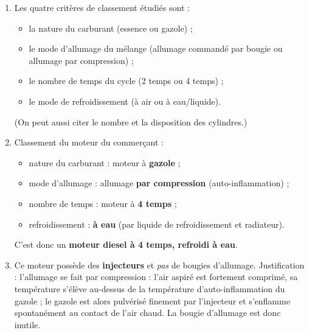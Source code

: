 \documentclass[11pt]{article}
\newcommand{\cle}[1]{{\popxbold\color{popdark}#1}}
\begin{document}
\begin{corrige}
\begin{enumerate}
\item Les quatre critères de classement étudiés sont :
\begin{itemize}
\item la \cle{nature du carburant} (essence ou gazole) ;
\item le \cle{mode d'allumage} du mélange (allumage commandé par bougie ou allumage par compression) ;
\item le \cle{nombre de temps} du cycle (2 temps ou 4 temps) ;
\item le \cle{mode de refroidissement} (à air ou à eau/liquide).
\end{itemize}
(On peut aussi citer le nombre et la disposition des cylindres.)
\item Classement du moteur du commerçant :
\begin{itemize}
\item nature du carburant : moteur à \textbf{gazole} ;
\item mode d'allumage : allumage \textbf{par compression} (auto-inflammation) ;
\item nombre de temps : moteur à \textbf{4 temps} ;
\item refroidissement : \textbf{à eau} (par liquide de refroidissement et radiateur).
\end{itemize}
C'est donc un \textbf{moteur diesel à 4 temps, refroidi à eau}.
\item Ce moteur possède des \textbf{injecteurs} et \emph{pas} de bougies d'allumage. Justification : l'allumage se fait par compression : l'air aspiré est fortement comprimé, sa température s'élève au-dessus de la température d'auto-inflammation du gazole ; le gazole est alors pulvérisé finement par l'injecteur et s'enflamme spontanément au contact de l'air chaud. La bougie d'allumage est donc inutile.
\end{enumerate}
\end{corrige}
\end{document}
